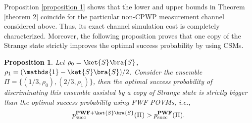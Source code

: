 \documentclass[aps,pra,twocolumn,floatfix,amsfonts,10pt]{revtex4-2}
\newtheorem{proposition}{Proposition}
\begin{document}
Proposition \ref{proposition 1} shows that the lower and upper bounds in Theorem \ref{theorem 2} coincide for the particular non-CPWP measurement channel considered above. 
Thus, its exact channel simulation cost is completely characterized. 
Moreover, the following proposition proves that one copy of the Strange state strictly improves the optimal success probability by using CSMs.

\begin{proposition}\label{proposition 2}
	Let $\rho_0 = \ket{S}\bra{S}$, $\rho_1 = (\mathds{1}-\ket{S}\bra{S})/2$.
	Consider the ensemble  $\Pi = \{(1/3,\rho_0), 
	(2/3,\rho_1)\}$, then the optimal success probability of discriminating this ensemble assisted by a copy of Strange state is strictly bigger than the optimal success probability using PWF POVMs, i.e.,
	\begin{equation}
		p_{\mathrm{succ}}^{\mathbf{PWF}+\ket{S}\bra{S}}(\Pi) > p_{\mathrm{succ}}^{\mathbf{PWF}}(\Pi).
	\end{equation}
\end{proposition}
\end{document}

